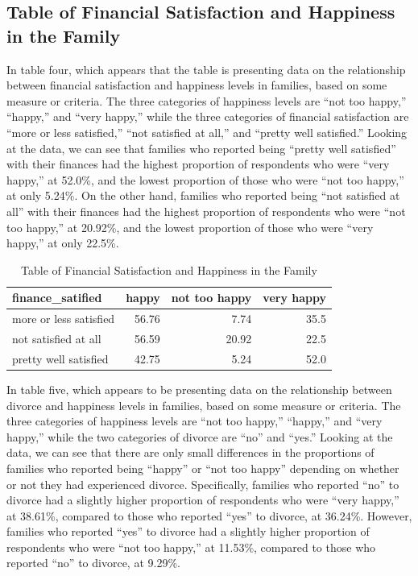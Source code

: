 \documentclass[
  letterpaper,
  DIV=11,
  numbers=noendperiod]{scrartcl}
\begin{document}
\hypertarget{table-of-financial-satisfaction-and-happiness-in-the-family}{%
\subsection{Table of Financial Satisfaction and Happiness in the
Family}\label{table-of-financial-satisfaction-and-happiness-in-the-family}}

In table four, which appears that the table is presenting data on the
relationship between financial satisfaction and happiness levels in
families, based on some measure or criteria. The three categories of
happiness levels are ``not too happy,'' ``happy,'' and ``very happy,''
while the three categories of financial satisfaction are ``more or less
satisfied,'' ``not satisfied at all,'' and ``pretty well satisfied.''
Looking at the data, we can see that families who reported being
``pretty well satisfied'' with their finances had the highest proportion
of respondents who were ``very happy,'' at 52.0\%, and the lowest
proportion of those who were ``not too happy,'' at only 5.24\%. On the
other hand, families who reported being ``not satisfied at all'' with
their finances had the highest proportion of respondents who were ``not
too happy,'' at 20.92\%, and the lowest proportion of those who were
``very happy,'' at only 22.5\%.

\begin{table}

\caption{Table of Financial Satisfaction and Happiness in the Family}
\centering
\begin{tabular}[t]{l|r|r|r}
\hline
finance\_satified & happy & not too happy & very happy\\
\hline
more or less satisfied & 56.76 & 7.74 & 35.5\\
\hline
not satisfied at all & 56.59 & 20.92 & 22.5\\
\hline
pretty well satisfied & 42.75 & 5.24 & 52.0\\
\hline
\end{tabular}
\end{table}

In table five, which appears to be presenting data on the relationship
between divorce and happiness levels in families, based on some measure
or criteria. The three categories of happiness levels are ``not too
happy,'' ``happy,'' and ``very happy,'' while the two categories of
divorce are ``no'' and ``yes.'' Looking at the data, we can see that
there are only small differences in the proportions of families who
reported being ``happy'' or ``not too happy'' depending on whether or
not they had experienced divorce. Specifically, families who reported
``no'' to divorce had a slightly higher proportion of respondents who
were ``very happy,'' at 38.61\%, compared to those who reported ``yes''
to divorce, at 36.24\%. However, families who reported ``yes'' to
divorce had a slightly higher proportion of respondents who were ``not
too happy,'' at 11.53\%, compared to those who reported ``no'' to
divorce, at 9.29\%.
\end{document}
